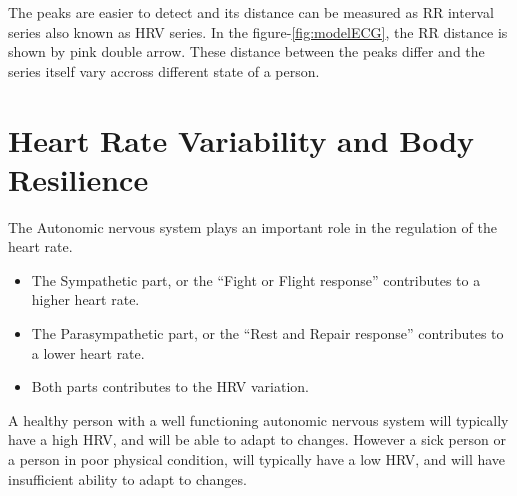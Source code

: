 \documentclass[a4paper, 11pt]{report}\usepackage[]{graphicx}\usepackage[]{color}
\numberwithin{figure}{section}
\begin{document}

The peaks are easier to detect and its distance can be measured as RR interval series also known as HRV series. In the figure-\ref{fig:modelECG}, the RR distance is shown by pink double arrow. These distance between the peaks differ and the series itself vary accross different state of a person.
\section{Heart Rate Variability and Body Resilience}
The Autonomic nervous system plays an important role in the regulation of the heart rate.

\begin{itemize}
\item The Sympathetic part, or the ``Fight or Flight response'' contributes to a higher heart rate.
\item The Parasympathetic part, or the “Rest and Repair response” contributes to a lower heart rate.
\item Both parts contributes to the HRV variation.
\end{itemize}


A healthy person with a well functioning autonomic nervous system will typically have a high HRV, and will be able to adapt to changes. However a sick person or a person in poor physical condition, will typically have a low HRV, and will have insufficient ability to adapt to changes.
\end{document}
